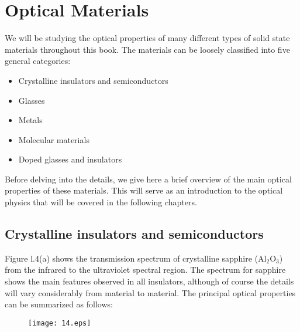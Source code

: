 \documentclass[12pt]{book}
\begin{document}
\section{Optical Materials}

We will be studying the optical properties of many different types of solid state materials throughout this book. The materials can be loosely classified into five general categories:
\begin{itemize}
  \item Crystalline insulators and semiconductors
  \item Glasses
  \item Metals
  \item Molecular materials
  \item Doped glasses and insulators
\end{itemize}
Before delving into the details, we give here a brief overview of the main optical properties of these materials. This will serve as an introduction to the optical physics that will be covered in the following chapters.

\subsection{Crystalline insulators and semiconductors}

Figure l.4(a) shows the transmission spectrum of crystalline sapphire ($\mathrm{Al_2O_3}$) from the infrared to the ultraviolet spectral region. The spectrum for sapphire shows the main features observed in all insulators, although of course the details will vary considerably from material to material. The principal optical properties can be summarized as follows:
\begin{figure}[htbp]
\begin{center}
\texttt{[image: 14.eps]}
\label{fig:1.4}
\end{center}
\end{figure}
\end{document}
